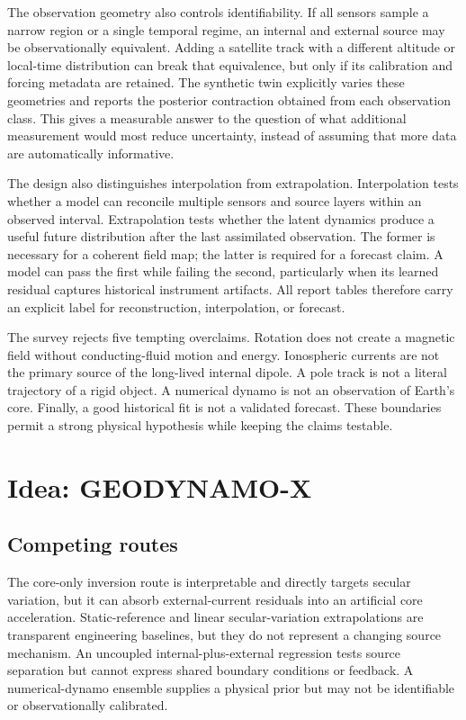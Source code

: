\documentclass[conference]{IEEEtran}
\begin{document}
The observation geometry also controls identifiability. If all sensors sample a narrow region or a single temporal regime, an internal and external source may be observationally equivalent. Adding a satellite track with a different altitude or local-time distribution can break that equivalence, but only if its calibration and forcing metadata are retained. The synthetic twin explicitly varies these geometries and reports the posterior contraction obtained from each observation class. This gives a measurable answer to the question of what additional measurement would most reduce uncertainty, instead of assuming that more data are automatically informative.

The design also distinguishes interpolation from extrapolation. Interpolation tests whether a model can reconcile multiple sensors and source layers within an observed interval. Extrapolation tests whether the latent dynamics produce a useful future distribution after the last assimilated observation. The former is necessary for a coherent field map; the latter is required for a forecast claim. A model can pass the first while failing the second, particularly when its learned residual captures historical instrument artifacts. All report tables therefore carry an explicit label for reconstruction, interpolation, or forecast.

The survey rejects five tempting overclaims. Rotation does not create a magnetic field without conducting-fluid motion and energy. Ionospheric currents are not the primary source of the long-lived internal dipole. A pole track is not a literal trajectory of a rigid object. A numerical dynamo is not an observation of Earth's core. Finally, a good historical fit is not a validated forecast. These boundaries permit a strong physical hypothesis while keeping the claims testable.

\section{Idea: GEODYNAMO-X}
\subsection{Competing routes}
The core-only inversion route is interpretable and directly targets secular variation, but it can absorb external-current residuals into an artificial core acceleration. Static-reference and linear secular-variation extrapolations are transparent engineering baselines, but they do not represent a changing source mechanism. An uncoupled internal-plus-external regression tests source separation but cannot express shared boundary conditions or feedback. A numerical-dynamo ensemble supplies a physical prior but may not be identifiable or observationally calibrated.
\end{document}
